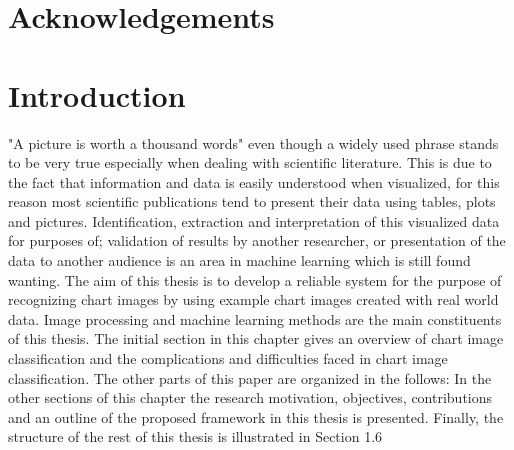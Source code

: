 \documentclass[12pt, a4paper,oneside]{report}
\begin{document}

\setcounter{tocdepth}{10}

\clearpage
\tableofcontents





\listoffigures
\listoftables

\titleformat{\chapter}{\LARGE\bfseries}{\thechapter}{1em}{}

\newpage
\chapter{Acknowledgements}
 

\newpage
\chapter{Introduction}
"A picture is worth a thousand words" even though a widely used phrase stands to be very true especially when dealing with scientific literature. This is due to the fact that information and data is easily understood when visualized, for this reason most scientific publications tend to present their data using tables, plots and pictures. Identification, extraction and interpretation of this visualized data for purposes of; validation of results by another researcher, or presentation of the data to another audience is an area in machine learning which is still found wanting.\newline\newline
The aim of this thesis is to develop a reliable system for the purpose of recognizing chart images by using example chart images created with real world data. Image processing and machine learning methods are the main constituents of this thesis. The initial section in this chapter gives an overview of chart image classification and the complications and difficulties faced in chart image classification.  The other parts of this paper are organized in the follows: 
In the other sections of this chapter the research motivation, objectives, contributions and an outline of
the proposed framework in this thesis is presented. Finally, the structure of the rest of this thesis is illustrated in Section 1.6
\end{document}
